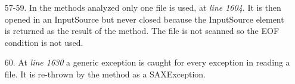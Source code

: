\begin{itemize}
\item [57-59.] In the methods analyzed only one file is used, at \textit{line 1604}.
It is then opened in an InputSource but never closed because the InputSource element is returned as the result of the method. The file is not scanned so the EOF condition is not used.


\begin{comment}Files are properly declared but no files are opened.
\item [58.] In the methods analyzed no files are opened and scanned, but only retrieved and instantiated.
\item [59.] No EOF condition is used because no entire files are scanned.
\end{comment}


\item [60.] At \textit{line 1630} a generic exception is caught for every exception in reading a file. It is re-thrown by the method as a SAXException. 
\end{itemize}